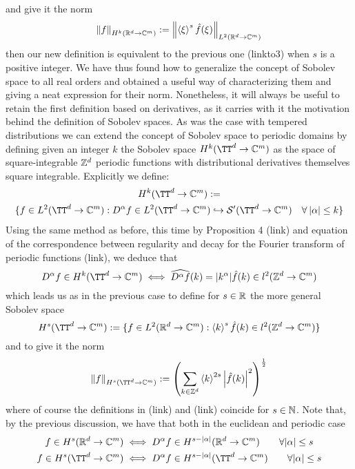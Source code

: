 \documentclass[12pt]{article}
\newcommand{\br}[1]{\left\langle#1\right\rangle}
\begin{document}
and give it the norm
\[\norm{f}_{H^k(\R^d\to\C^m)}:= \norm{\br{\xi}^s\hat{f}(\xi)}_{L^2(\R^d\to\C^m)}\]
then our new definition is equivalent to the previous one (linkto3)  when $s$ is a positive integer. We have thus found how to generalize the concept of Sobolev space to all real orders and obtained a useful way of characterizing them and giving a neat expression for their norm. Nonetheless, it will always be useful to retain the first definition based on derivatives, as it carries with it the motivation behind the definition of Sobolev spaces.\bigbreak
As was the case with tempered distributions we can extend the concept of Sobolev space to periodic domains by defining given an integer $k$ the Sobolev space $H^k(\TT^d\to\C^m)$ as the space of square-integrable ${\mathbb Z}^d$ periodic functions with distributional derivatives themselves square integrable. Explicitly we define:
\begin{multline}\label{sobolevdef2}
	H^k(\TT^d\to\C^m):=\\\lbrace f\in L^2(\TT^d\to\C^m): D^\alpha f\in L^2(\TT^d\to\C^m)\hookrightarrow\Ss '(\TT^d\to\C^m)\quad\forall\hspace{2pt}\abs{\alpha}\leq k\rbrace
\end{multline}
Using the same method as before, this time by Proposition 4 (link) and equation of the correspondence between regularity and decay for the Fourier transform of periodic functions (link), we deduce that
\[D^\alpha f\in H^k(\TT^d\to\C^m)\iff\widehat{D^\alpha f}(k)=\abs{k^\alpha}\hat{f}(k)\in l^2(\Z^d\to\C^m)\]
which leads us as in the previous case to define for $s\in{\mathbb R}$ the more general Sobolev space
\[H^s(\TT^d\to\C^m):=\lbrace f\in L^2(\R^d\to\C^m): \br{k}^{s}\hat{f}(k)\in l^2(\Z^d\to\C^m)\rbrace\]
and to give it the norm
\begin{equation}\label{sobolevgeneraldef}
	\norm{f}_{H^s(\TT^d\to\C^m)}:=\left(\sum_{k\in\Z^d}\br{k}^{2s}\abs{\hat{f}(k)}^2\right)^{\frac{1}{2}}
\end{equation}
where of course the definitions in (link) and (link) coincide for $s\in\mathbb{N}$.
Note that, by the previous discussion, we have that both in the euclidean and periodic case
\begin{align}\label{Sobolev derivatives embedding}
	f\in H^s(\R^d\to\C^m)  & \iff  D^\alpha f\in H^{s-\abs{\alpha}}(\R^d\to\C^m)\qquad\forall\abs{\alpha}\leq s  \\
	f\in H^s(\TT^d\to\C^m) & \iff  D^\alpha f\in H^{s-\abs{\alpha}}(\TT^d\to\C^m)\qquad\forall\abs{\alpha}\leq s
\end{align}
\end{document}
